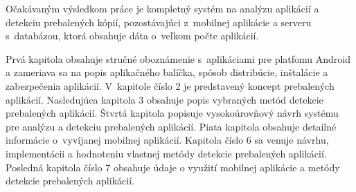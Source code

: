 Očakávaným výsledkom práce je kompletný systém na analýzu aplikácií a detekciu prebalených kópií, pozostávajúci z~mobilnej aplikácie a serveru s~databázou, ktorá obsahuje dáta o~veľkom počte aplikácií.

Prvá kapitola obsahuje stručné oboznámenie s~aplikáciami pre platfomu Android a zameriava sa na popis aplikačného balíčka, spôsob distribúcie, inštalácie a zabezpečenia aplikácií. V~kapitole číslo 2 je predstavený koncept prebalených aplikácií. Nasledujúca kapitola 3 obsahuje popis vybraných metód detekcie prebalených aplikácií. Štvrtá kapitola popisuje vysokoúrovňový návrh systému pre analýzu a detekciu prebalených aplikácií. Piata kapitola obsahuje detailné informácie o~vyvíjanej mobilnej aplikácií. Kapitola číslo 6 sa venuje návrhu, implementácii a hodnoteniu vlastnej metódy detekcie prebalených aplikácií. Posledná kapitola číslo 7 obsahuje údaje o využití mobilnej aplikácie a metódy detekcie prebalených aplikácií.

